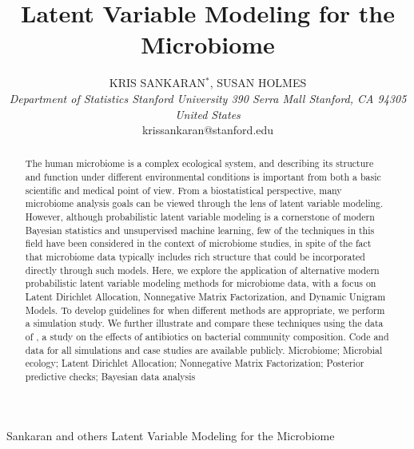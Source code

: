 \documentclass[oupdraft]{bio}
\begin{document}
\title{Latent Variable Modeling for the Microbiome}

\author{
  KRIS SANKARAN$^\ast$, SUSAN HOLMES\\[4pt]
  \textit{
    Department of Statistics
    Stanford University
    390 Serra Mall
    Stanford, CA 94305
    United States
  } \\[2pt]
  {krissankaran@stanford.edu}
}

\markboth
{Sankaran and others}
{Latent Variable Modeling for the Microbiome}

\maketitle


\begin{abstract}
  {
    The human microbiome is a complex ecological system, and describing its
    structure and function under different environmental conditions is important
    from both a basic scientific and medical point of view. From a
    biostatistical perspective, many microbiome analysis goals can be viewed
    through the lens of latent variable modeling. However, although
    probabilistic latent variable modeling is a cornerstone of modern Bayesian
    statistics and unsupervised machine learning, few of the techniques in this
    field have been considered in the context of microbiome studies, in spite of
    the fact that microbiome data typically includes rich structure that could
    be incorporated directly through such models. Here, we explore the
    application of alternative modern probabilistic latent variable modeling
    methods for microbiome data, with a focus on Latent Dirichlet Allocation,
    Nonnegative Matrix Factorization, and Dynamic Unigram Models. To develop
    guidelines for when different methods are appropriate, we perform a
    simulation study. We further illustrate and compare these techniques using
    the data of \citep{dethlefsen2011incomplete}, a study on the effects of
    antibiotics on bacterial community composition. Code and data for all
    simulations and case studies are available publicly.
  }
  {
    Microbiome; Microbial ecology; Latent Dirichlet Allocation; Nonnegative Matrix Factorization; Posterior predictive checks; Bayesian data analysis
  }
\end{abstract}
\end{document}
